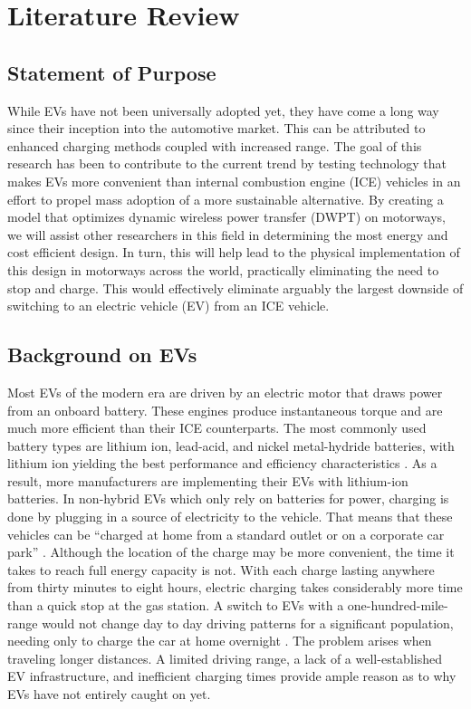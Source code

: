 
\renewcommand{\thechapter}{2}

\chapter{Literature Review}

\section{Statement of Purpose}
While EVs have not been universally adopted yet, they have come a long way since their inception into the 
automotive market. This can be attributed to enhanced charging methods coupled with increased range. 
The goal of this research has been to contribute to the current trend by testing technology that makes 
EVs more convenient than internal combustion engine (ICE) vehicles in an effort to propel mass adoption 
of a more sustainable alternative. By creating a model that optimizes dynamic wireless power transfer 
(DWPT) on motorways, we will assist other researchers in this field in determining the most energy and 
cost efficient design. In turn, this will help lead to the physical implementation of this design in 
motorways across the world, practically eliminating the need to stop and charge. This would effectively 
eliminate arguably the largest downside of switching to an electric vehicle (EV) from an ICE vehicle.	

\section{Background on EVs}
Most EVs of the modern era are driven by an electric motor that draws power from an onboard battery. 
These engines produce instantaneous torque and are much more efficient than their ICE counterparts.  
The most commonly used battery types are lithium ion, lead-acid, and nickel metal-hydride batteries, 
with lithium ion yielding the best performance and efficiency characteristics \cite{eberhard_21_2007}.  
As a result, more manufacturers are implementing their EVs with lithium-ion batteries.  In non-hybrid EVs 
which only rely on batteries for power, charging is done by plugging in a source of electricity to the vehicle.  
That means that these vehicles can be “charged at home from a standard outlet or on a corporate car park” 
\cite{clement-nyns_impact_2010}.  Although the location of the charge may be more convenient, 
the time it takes to reach full energy capacity is not.  With each charge lasting anywhere from thirty minutes 
to eight hours, electric charging takes considerably more time than a quick stop at the gas station. A switch 
to EVs with a one-hundred-mile-range would not change day to day driving patterns for a significant population, 
needing only to charge the car at home overnight \cite{pearre_electric_2011}. The problem arises 
when traveling longer distances. A limited driving range, a lack of a well-established EV infrastructure, and 
inefficient charging times provide ample reason as to why EVs have not entirely caught on yet.

